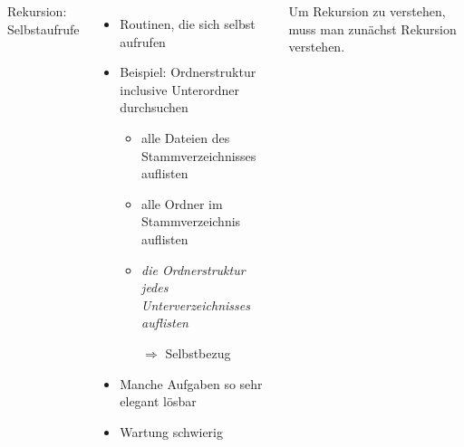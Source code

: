 
\begin{frame}[t,plain]
\titlepage
\end{frame}


\begin{frame}[t,fragile]%
%
\begin{columns}[T]
\begin{Large}
Rekursion: Selbstaufrufe
\vspace{10pt}
\end{Large}
%
\begin{itemize}
\item Routinen, die sich selbst aufrufen
\item Beispiel: Ordnerstruktur inclusive Unterordner durchsuchen
	\begin{itemize}
	\item alle Dateien des Stammverzeichnisses auflisten
	\item alle Ordner im Stammverzeichnis auflisten
	\item \emph{die Ordnerstruktur jedes Unterverzeichnisses auflisten}
	\item[$\Rightarrow$] Selbstbezug
	\end{itemize}
\item Manche Aufgaben so sehr elegant lösbar
\item Wartung schwierig
\end{itemize}
%
\begin{hintbox}
\footnotesize Um Rekursion zu verstehen, muss man zunächst Rekursion verstehen.
\end{hintbox}
%

\end{columns}
\end{frame}
